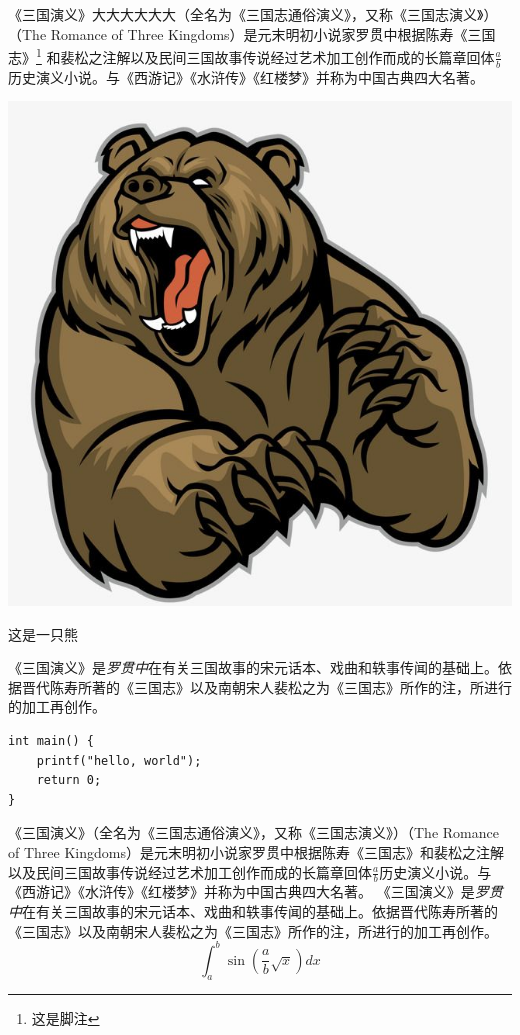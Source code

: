 《三国演义》大大大大大大（全名为《三国志通俗演义》，又称《三国志演义》）（The Romance of Three Kingdoms）是元末明初小说家罗贯中根据陈寿《三国志》\footnote{这是脚注}%
和裴松之注解以及民间三国故事\cite{DiChenHua2021}传说经过艺术加工创作而成的长篇章回体$\frac{a}{b}$历史演义小说。与《西游记》《水浒传》《红楼梦》并称为中国古典四大名著。
\begin{marginfigure}[1.5cm]
\includegraphics[width=\linewidth]{images/bear.jpeg}
\caption{这是一只熊}
\end{marginfigure}
《三国演义》是\emph{罗贯中}在有关{\sffamily 三国故事的宋元话本}、戏曲和轶事传闻的基础上。依据晋代陈寿所著的《三国志》以及南朝宋人裴松之为《三国志》所作的注，所进行的加工再创作。

\begin{listing}
\begin{verbatim}
int main() {
    printf("hello, world");
    return 0;
}
\end{verbatim}
\end{listing}

《三国演义》（全名为《三国志通俗演义》，又称《三国志演义》）（The Romance of Three Kingdoms）是元末明初小说家罗贯中根据陈寿\cite{ausubel1991}《三国志》和裴松之注解以及民间三国故事传说经过艺术加工创作而成的长篇章回体$\frac{a}{b}$历史演义小说。与《西游记》《水浒传》《红楼梦》并称为中国古典四大名著。
《三国演义》是\emph{罗贯中}在有关{\sffamily 三国故事的宋元话本}、戏曲和轶事传闻的基础上。依据晋代陈寿所著的《三国志》以及南朝宋人裴松之为《三国志》所作的注，所进行的加工再创作。
\begin{equation}
    \int_a^b\sin(\frac{a}{b}\sqrt{x})dx
\end{equation}

